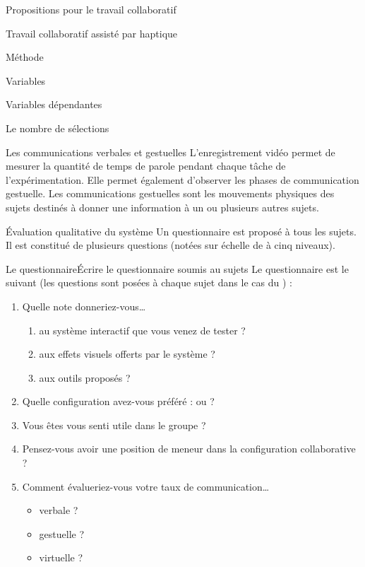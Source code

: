 \documentclass[myfrancais]{mythesis}
\begin{document}
\begin{mypart}{Propositions pour le travail collaboratif}
\begin{mychapter}{Travail collaboratif assisté par haptique}
\begin{mysection}{Méthode}
\begin{mysubsection}{Variables}
\begin{mysubsubsection}{Variables dépendantes}
\begin{myparagraph}{ Le nombre de sélections}
						\end{myparagraph}
						\begin{myparagraph}{ Les communications verbales et gestuelles}
							L'enregistrement vidéo permet de mesurer la quantité de temps de parole pendant chaque tâche de l'expérimentation.
							Elle permet également d'observer les phases de communication gestuelle.
							Les communications gestuelles sont les mouvements physiques des sujets destinés à donner une information à un ou plusieurs autres sujets.
						\end{myparagraph}
						\begin{myparagraph}{ Évaluation qualitative du système}
							Un questionnaire est proposé à tous les sujets.
							Il est constitué de plusieurs questions (notées sur échelle de  à cinq niveaux).

							\begin{myTodo}{Le questionnaire}{Écrire le questionnaire soumis au sujets}
								Le questionnaire est le suivant (les questions sont posées à chaque sujet dans le cas du ) :
								\begin{enumerate}
									\item Quelle note donneriez-vous\dots{}
										\begin{enumerate}
											\item au système interactif que vous venez de tester ?
											\item aux effets visuels offerts par le système ?
											\item aux outils proposés ?
										\end{enumerate}
									\item Quelle configuration avez-vous préféré :  ou  ?
									\item Vous êtes vous senti utile dans le groupe ?
									\item Pensez-vous avoir une position de meneur dans la configuration collaborative ?
									\item Comment évalueriez-vous votre taux de communication\dots{}
										\begin{itemize}
											\item verbale ?
											\item gestuelle ?
											\item virtuelle ?
										\end{itemize}
								\end{enumerate}
							\end{myTodo}


\end{myparagraph}
\end{mysubsubsection}
\end{mysubsection}
\end{mysection}
\end{mychapter}
\end{mypart}
\end{document}
